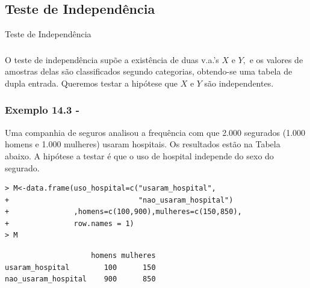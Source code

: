 \documentclass[14pt,aspectratio=1610]{beamer}
\begin{document}
\subsection{Teste de Independência}
\begin{frame}{Teste de Independência}
\frametitle{}
\begin{block}{}
\justifying
O teste de independência supõe a existência de duas v.a.’s $X$ e $Y,$ e os valores de amostras delas são classificados segundo categorias, obtendo-se uma tabela de dupla entrada. Queremos testar a hipótese que $X$ e $Y$ são independentes.
\end{block}
\end{frame}

\begin{frame}[fragile]{}
\frametitle{Exemplo 14.3 - \cite{Morettin09}}
\small
\begin{block}{}
\justifying
Uma companhia de seguros analisou a frequência com que 2.000 segurados (1.000 homens e 1.000 mulheres) usaram hospitais. Os resultados estão na Tabela abaixo. A hipótese a testar é que o uso de hospital independe do sexo do segurado.
\begin{verbatim}
> M<-data.frame(uso_hospital=c("usaram_hospital", 
+                              "nao_usaram_hospital")
+               ,homens=c(100,900),mulheres=c(150,850), 
+               row.names = 1)
> M    
\end{verbatim}

\begin{verbatim}
                    homens mulheres
usaram_hospital        100      150
nao_usaram_hospital    900      850    
\end{verbatim}

\end{block}
\end{frame}
\end{document}
